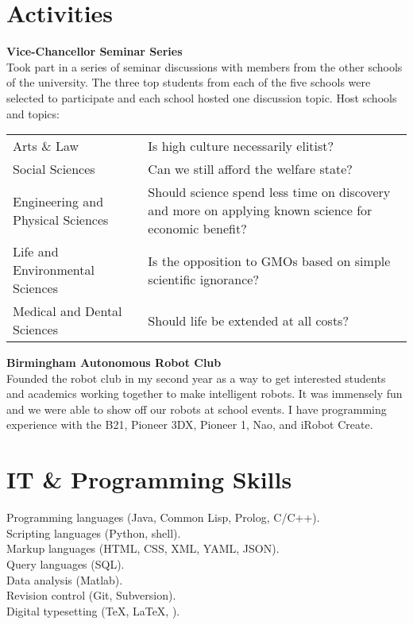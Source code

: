 \documentclass[10pt, a4paper]{article}
\newcommand{\years}[1]{\marginnote{\scriptsize #1}}
\begin{document}
\section*{Activities}
\years{2011--2012}\textbf{Vice-Chancellor Seminar Series}\\[.2cm]
Took part in a series of seminar discussions with members from the
other schools of the university. The three top students from each of
the five schools were selected to participate and each school hosted
one discussion topic. Host schools and topics:\\[.1cm]
\small{
  \begin{tabular}{l p{8cm}}
    \hspace{.5cm}Arts \& Law & Is high culture necessarily elitist?\\
    \hspace{.5cm}Social Sciences & Can we still afford the welfare state?\\
    \hspace{.5cm}Engineering and Physical Sciences & Should science spend less time on discovery and more on applying known science for economic benefit?\\
    \hspace{.5cm}Life and Environmental Sciences & Is the opposition to GMOs based on simple scientific ignorance?\\
    \hspace{.5cm}Medical and Dental Sciences & Should life be extended at all costs?
  \end{tabular}
}
\vspace{.3cm}

\years{2010--2012}\textbf{Birmingham Autonomous Robot Club}\\[.2cm]
Founded the robot club in my second year as a way to get interested
students and academics working together to make intelligent robots. It
was immensely fun and we were able to show off our robots at school
events. I have programming experience with the B21, Pioneer 3DX,
Pioneer 1, Nao, and iRobot Create.

\section*{IT \& Programming Skills}
Programming languages (Java, Common Lisp, Prolog, C/C++).\\
Scripting languages (Python, shell).\\
Markup languages (HTML, CSS, XML, YAML, JSON).\\
Query languages (SQL).\\
Data analysis (Matlab).\\
Revision control (Git, Subversion).\\
Digital typesetting (\TeX, \LaTeX, \XeTeX).
\end{document}
